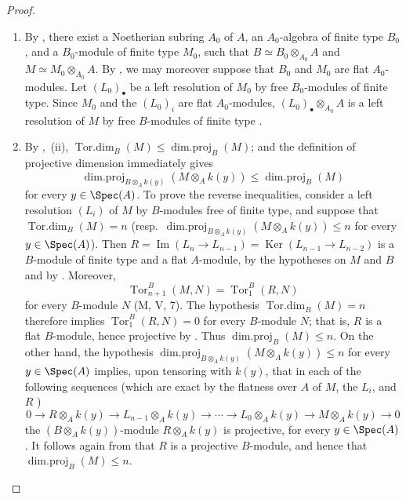 \begin{proof}
\begin{enumerate}[label=(\roman*)]
  \item By , there exist a Noetherian subring $A_0$ of $A$, an $A_0$-algebra of finite type $B_0$, and a $B_0$-module of finite type $M_0$, such that $B\simeq B_0\otimes_{A_0}A$ and $M\simeq M_0\otimes_{A_0}A$.
  By , we may moreover suppose that $B_0$ and $M_0$ are flat $A_0$-modules.
  Let $(L_0)_\bullet$ be a left resolution of $M_0$ by free $B_0$-modules of finite type.
  Since $M_0$ and the $(L_0)_i$ are flat $A_0$-modules, $(L_0)_\bullet\otimes_{A_0}A$ is a left resolution of $M$ by free $B$-modules of finite type .

  \item By ,~(ii),
  $\operatorname{Tor.dim}_B(M)\leqslant\operatorname{dim.proj}_B(M)$; and the definition of projective dimension immediately gives
  \[
    \operatorname{dim.proj}_{B\otimes_A k(y)}(M\otimes_A k(y))
    \leqslant \operatorname{dim.proj}_B(M)
  \]
  for every $y\in\Spec(A)$.
  To prove the reverse inequalities, consider a left resolution $(L_i)$ of $M$ by $B$-modules free of finite type, and suppose that $\operatorname{Tor.dim}_B(M)=n$ (resp.\ $\operatorname{dim.proj}_{B\otimes_A k(y)}(M\otimes_A k(y))\leqslant n$ for every $y\in\Spec(A)$).
  Then
  $R=\operatorname{Im}(L_n\to L_{n-1})=\operatorname{Ker}(L_{n-1}\to L_{n-2})$
  is a $B$-module of finite type and a flat $A$-module, by the hypotheses on $M$ and $B$ and by .
  Moreover,
  \[
    \operatorname{Tor}_{n+1}^B(M,N)=\operatorname{Tor}_1^B(R,N)
  \]
  for every $B$-module $N$ (M, V, 7).
  The hypothesis $\operatorname{Tor.dim}_B(M)=n$ therefore implies $\operatorname{Tor}_1^B(R,N)=0$ for every $B$-module $N$; that is, $R$ is a flat $B$-module, hence projective by .
  Thus $\operatorname{dim.proj}_B(M)\leqslant n$.
  On the other hand, the hypothesis $\operatorname{dim.proj}_{B\otimes_A k(y)}(M\otimes_A k(y))\leqslant n$ for every $y\in\Spec(A)$ implies, upon tensoring with $k(y)$, that in each of the following sequences (which are exact by the flatness over $A$ of $M$, the $L_i$, and $R$ )
  \[
    0\to R\otimes_A k(y)\to L_{n-1}\otimes_A k(y)\to\cdots\to L_0\otimes_A k(y)\to M\otimes_A k(y)\to 0
  \]
  the $(B\otimes_A k(y))$-module $R\otimes_A k(y)$ is projective, for every $y\in\Spec(A)$.
  It follows again from  that $R$ is a projective $B$-module, and hence that $\operatorname{dim.proj}_B(M)\leqslant n$.
\end{enumerate}
\end{proof}

